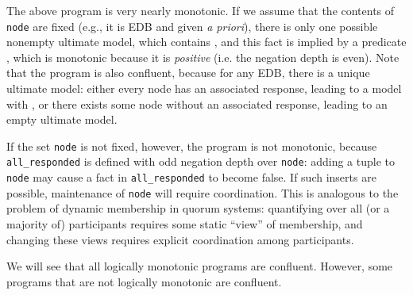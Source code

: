 The above program is very nearly monotonic. If we assume that the contents of \texttt{node}
are fixed (e.g., it is EDB and given \emph{a priori}), there is only one possible nonempty ultimate model, which contains , and this fact is implied by a predicate , which is monotonic because it is {\em positive} (i.e. the negation depth is even). 
Note that the program is also confluent, because for any EDB, there is a unique ultimate model: either every node has an associated response, leading to a model with , or there exists some node without an associated response, leading to an empty ultimate model.

If the set \texttt{node} is not fixed, however, the program is not monotonic, because 
\texttt{all\_responded} is defined with odd negation depth over \texttt{node}: adding a tuple
to \texttt{node} may cause a fact in \texttt{all\_responded} to become false.  If such inserts
are possible, maintenance of \texttt{node} will require coordination.  This is analogous to
the problem of dynamic membership in quorum systems: quantifying over all (or a majority
of) participants requires some static ``view'' of membership, and changing these views requires
explicit coordination among participants.

We will see that all logically monotonic programs are confluent.  However, some programs that are not logically monotonic are confluent.

